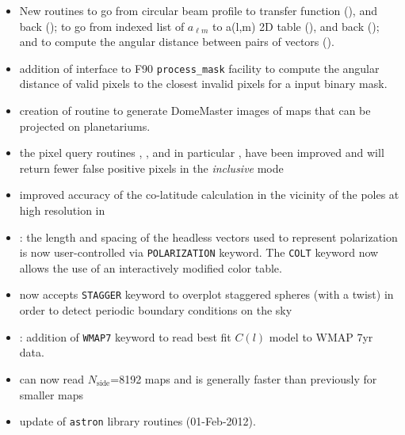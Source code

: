 \documentclass[12pt,twoside]{article}
\newcommand{\nside}{N_\mathrm{side}}
\newcommand{\linklatexhtml}[3]{%
\latexhtml{\htmladdnormallink{#1}{#2}}{\htmladdnormallink{#1}{#3}}}
\begin{document}
{{\tinysubsubsection*{\linklatexhtml{IDL}{idl.pdf}{idl.htm}}
\begin{itemize}
	\setlength{\itemsep}{0pt}
	\setlength{\parsep}{0pt}
	\item New routines to go from circular beam profile to transfer function
(), 
and back (); 
to go from indexed list of $a_{\ell m}$ to a(l,m) 2D table
(), 
and back
(); and to compute the angular distance
between pairs of vectors ().
%
	\item addition of 
interface to F90 {\tt process\_mask} facility to compute the angular distance of valid
pixels to the closest invalid pixels for a input binary mask.
%
	\item creation of  routine to generate
DomeMaster images of \healpix maps that can be projected on planetariums.
%
	\item the pixel query routines 
, 
, 
and in particular , 
have been improved and will return fewer
false positive pixels in the {\em inclusive} mode
%
	\item improved accuracy of the co-latitude calculation in the vicinity
of the poles at high resolution in 
%
	\item {}:
 the length and spacing of the headless vectors used to represent
polarization is now user-controlled  via 
{\tt POLARIZATION}
keyword. The {\tt COLT} keyword now
allows the use of an interactively modified color table.
%
	\item {} now accepts
{\tt STAGGER} keyword to overplot staggered
spheres (with a twist) in order to detect periodic boundary conditions on the
sky
	\item {}: addition of {{\tt WMAP7}} keyword
to read best fit $C(l)$ model to WMAP 7yr data.
	\item {} can now read
$\nside$=8192 \healpix maps and is generally faster than previously for smaller
maps
	\item update of {\tt astron} library routines (01-Feb-2012).
\end{itemize}

}}
\end{document}
